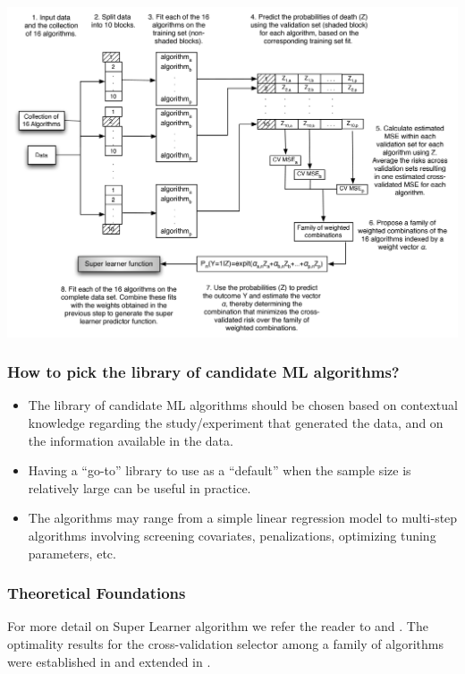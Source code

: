 \documentclass[
  12pt, krantz2,
]{book}
\providecommand{\tightlist}{%
  \setlength{\itemsep}{0pt}\setlength{\parskip}{0pt}}
\theoremstyle{definition}
\theoremstyle{definition}
\theoremstyle{definition}
\newcommand{\1}{\mathbbm{1}}
\begin{document}
\begin{center}\includegraphics[width=0.8\linewidth]{img/png/SLKaiserNew} \end{center}

\hypertarget{how-to-pick-the-library-of-candidate-ml-algorithms}{%
\subsubsection{How to pick the library of candidate ML algorithms?}\label{how-to-pick-the-library-of-candidate-ml-algorithms}}

\begin{itemize}
\tightlist
\item
  The library of candidate ML algorithms should be chosen based on contextual
  knowledge regarding the study/experiment that generated the data, and on the
  information available in the data.\\
\item
  Having a ``go-to'' library to use as a ``default'' when the sample size is
  relatively large can be useful in practice.
\item
  The algorithms may range from a simple linear regression model to multi-step
  algorithms involving screening covariates, penalizations, optimizing tuning
  parameters, etc.
\end{itemize}

\hypertarget{theoretical-foundations}{%
\subsubsection{Theoretical Foundations}\label{theoretical-foundations}}

For more detail on Super Learner algorithm we refer the reader to
\citet{polley2010super} and \citet{vdl2007super}. The optimality results for the
cross-validation selector among a family of algorithms were established in
\citet{vdl2003unified} and extended in \citet{vaart2006oracle}.
\end{document}

